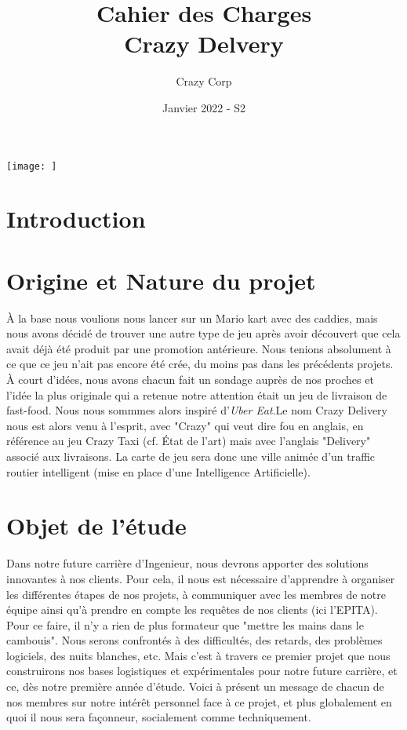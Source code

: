 \documentclass[11pt,a4paper]{article}
\newcommand{\AI}{Intelligence Artificielle}
\begin{document}
\title{Cahier des Charges \\ {\large Crazy Delvery}}
\author{Crazy Corp}
\date{Janvier 2022 - S2}
\maketitle

\begin{center}
  \texttt{[image: ]}
\end{center}

\tableofcontents
\clearpage

\section{Introduction}
  
\clearpage

\section{Origine et Nature du projet}
À la base nous voulions nous lancer sur un Mario kart avec des caddies, mais nous avons décidé de trouver une autre type de jeu après avoir découvert que cela avait déjà été produit par une promotion antérieure. Nous tenions absolument à ce que ce jeu n'ait pas encore été crée, du moins pas dans les précédents projets. À court d'idées, nous avons chacun fait un sondage auprès de nos proches et l'idée la plus originale qui a retenue notre attention était un jeu de livraison de fast-food. Nous nous sommmes alors inspiré d'\textit{Uber Eat}.Le nom Crazy Delivery nous est alors venu à l'esprit, avec "Crazy" qui veut dire fou en anglais, en référence au jeu Crazy Taxi (cf. État de l’art) mais avec l'anglais "Delivery" associé aux livraisons.
La carte de jeu sera donc une ville animée d'un traffic routier intelligent (mise en place d'une \AI).



\section{Objet de l'étude}
 Dans notre future carrière d'Ingenieur, nous devrons apporter des solutions innovantes à nos clients.
  Pour cela, il nous est nécessaire d'apprendre à organiser les différentes étapes de nos projets, à communiquer avec les membres de notre équipe ainsi qu'à prendre en compte les requêtes de nos clients (ici l’EPITA). Pour ce faire, il n’y a rien de plus formateur que "mettre les mains dans le cambouis". Nous serons confrontés à des difficultés, des retards, des problèmes logiciels, des nuits blanches, etc. Mais c’est à travers ce premier projet que nous construirons nos bases logistiques et expérimentales pour notre future carrière, et ce, dès notre première année d’étude. Voici à présent un message de chacun de nos membres sur notre intérêt personnel face à ce projet, et plus globalement en quoi il nous sera façonneur, socialement comme techniquement. \\
  
\end{document}
